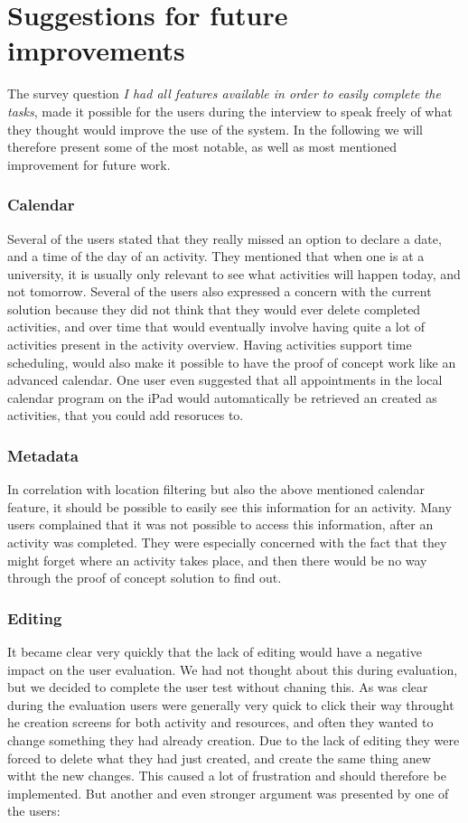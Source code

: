 \section{Suggestions for future improvements}
The survey question \emph{I had all features available in order to easily complete the tasks}, made it possible for the users during the interview to speak freely of what they thought would improve the use of the system. In the following we will therefore present some of the most notable, as well as most mentioned improvement for future work.

\subsubsection{Calendar}
Several of the users stated that they really missed an option to declare a date, and a time of the day of an activity. They mentioned that when one is at a university, it is usually only relevant to see what activities will happen today, and not tomorrow. Several of the users also expressed a concern with the current solution because they did not think that they would ever delete completed activities, and over time that would eventually involve having quite a lot of activities present in the activity overview. Having activities support time scheduling, would also make it possible to have the proof of concept work like an advanced calendar. One user even suggested that all appointments in the local calendar program on the iPad would automatically be retrieved an created as activities, that you could add resoruces to.

\subsubsection{Metadata}
In correlation with location filtering but also the above mentioned calendar feature, it should be possible to easily see this information for an activity. Many users complained that it was not possible to access this information, after an activity was completed. They were especially concerned with the fact that they might forget where an activity takes place, and then there would be no way through the proof of concept solution to find out.

\subsubsection{Editing}
It became clear very quickly that the lack of editing would have a negative impact on the user evaluation. We had not thought about this during evaluation, but we decided to complete the user test without chaning this. As was clear during the evaluation users were generally very quick to click their way throught he creation screens for both activity and resources, and often they wanted to change something they had already creation. Due to the lack of editing they were forced to delete what they had just created, and create the same thing anew witht the new changes. This caused a lot of frustration and should therefore be implemented. But another and even stronger argument was presented by one of the users:

